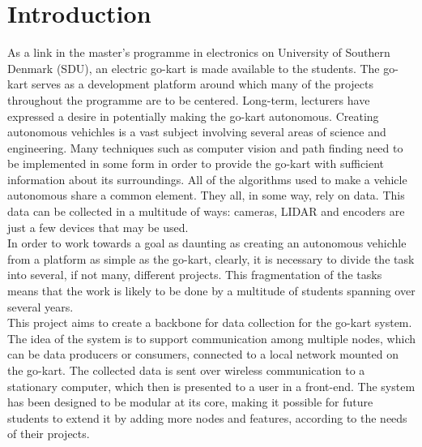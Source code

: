 \section{Introduction} %
\label{sec:introduction}
As a link in the master's programme in electronics on University of Southern Denmark (SDU), an electric go-kart is made available to the students.
The go-kart serves as a development platform around which many of the projects throughout the programme are to be centered.
Long-term, lecturers have expressed a desire in potentially making the go-kart autonomous.
Creating autonomous vehichles is a vast subject involving several areas of science and engineering.
Many techniques such as computer vision and path finding need to be implemented in some form in order to provide the go-kart with sufficient information about its surroundings.
All of the algorithms used to make a vehicle autonomous share a common element.
They all, in some way, rely on data.
This data can be collected in a multitude of ways: cameras, LIDAR and encoders are just a few devices that may be used.\\
In order to work towards a goal as daunting as creating an autonomous vehichle from a platform as simple as the go-kart, clearly, it is necessary to divide the task into several, if not many, different projects.
This fragmentation of the tasks means that the work is likely to be done by a multitude of students spanning over several years.\\
This project aims to create a backbone for data collection for the go-kart system.
The idea of the system is to support communication among multiple nodes, which can be data producers or consumers, connected to a local network mounted on the go-kart.
The collected data is sent over wireless communication to a stationary computer, which then is presented to a user in a front-end.
The system has been designed to be modular at its core, making it possible for future students to extend it by adding more nodes and features, according to the needs of their projects.

